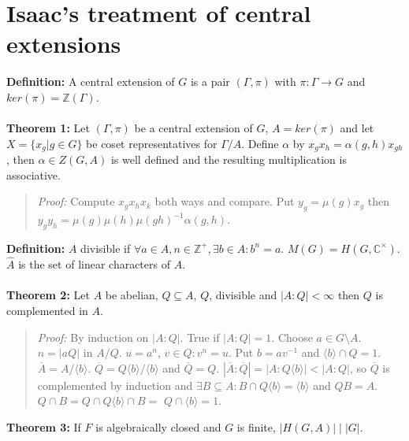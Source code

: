 \section{Isaac's treatment of central extensions}
{\bf Definition:} A central extension of $G$ is a pair $(\Gamma, \pi)$ with $\pi: \Gamma \rightarrow G$ and $ker(\pi) = {\mathbb Z}(\Gamma)$.
\\
\\
{\bf Theorem 1:}
Let $(\Gamma, \pi)$ be a central extension of $G$, $A=ker(\pi)$ and let $X= \{x_g| g \in G \}$ be coset representatives for $\Gamma/A$.
Define $\alpha$ by $x_g x_h = \alpha(g,h) x_{gh}$, then $\alpha \in Z(G,A)$ is well defined and the resulting multiplication is associative.
\begin{quote}
\emph{Proof:} Compute $x_g x_h x_k$ both ways and compare.  Put $y_g = \mu(g)x_g$ then
$y_g y_h = \mu(g) \mu(h) \mu(gh)^{-1} \alpha(g,h)$.
\end{quote}
{\bf Definition:} $A$ divisible if $\forall a \in A, n \in {\mathbb Z}^+, \exists b \in A: b^n=a$.  $M(G)= H(G, {\mathbb C}^{\times})$.
$\hat{A}$ is the set of linear characters of $A$.
\\
\\
{\bf Theorem 2:}
Let $A$ be abelian, $Q \subseteq A$, $Q$, divisible and $|A:Q| < \infty$ then $Q$ is complemented in $A$.
\begin{quote}
\emph{Proof:} By induction on $|A:Q|$.  True if $|A:Q|=1$.  Choose $a \in G \setminus A$. $n=|aQ|$ in $A/Q$.
$u = a^n$, $v \in Q: v^n=u$.  Put $b= av^{-1}$ and $\langle b \rangle \cap Q =1$.  ${\overline A}= A/\langle b \rangle$.
${\overline Q} = Q\langle b \rangle / \langle b \rangle$ and ${\overline Q} = Q$.  
$|{\overline A}:{\overline Q}| = |A:Q\langle b \rangle| < |A:Q|$, so ${\overline Q}$ is complemented by induction and 
$\exists B \subseteq A: B \cap Q\langle b \rangle = \langle b \rangle$ and $QB =A$.  $Q \cap B = Q \cap Q\langle b \rangle \cap B= $
$Q \cap \langle b \rangle = 1$.
\end{quote}
{\bf Theorem 3:}   If $F$ is algebraically closed and $G$ is finite, $|H(G,A)| \mid |G|$.
